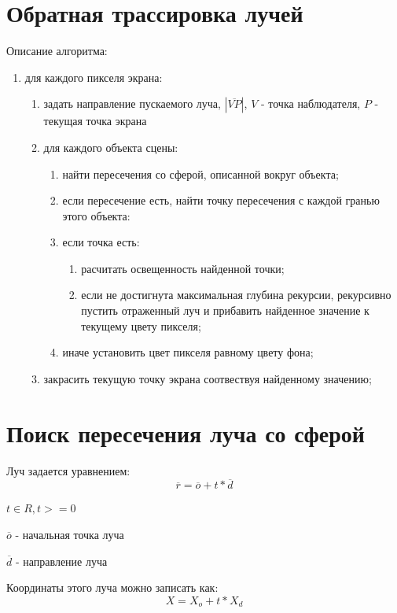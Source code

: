 \documentclass[12pt]{report}
\begin{document}
	\section{Обратная трассировка лучей}

	Описание алгоритма:
	\begin{enumerate}
		\item для каждого пикселя экрана:
		\begin{enumerate}
			\item задать направление пускаемого луча, $|\overline{VP}|$, $V$ - точка наблюдателя, $P$ - текущая точка экрана
			\item для каждого объекта сцены:
			\begin{enumerate}
				\item найти пересечения со сферой, описанной вокруг объекта;
				\item если пересечение есть, найти точку пересечения с каждой гранью этого объекта:
				\item если точка есть:
				\begin{enumerate}
					\item расчитать освещенность найденной точки;
					\item если не достигнута максимальная глубина рекурсии, рекурсивно пустить отраженный луч и прибавить найденное значение к текущему цвету пикселя;
				\end{enumerate}
				\item иначе установить цвет пикселя равному цвету фона;
			\end{enumerate}
			\item закрасить текущую точку экрана соотвествуя найденному значению;
		\end{enumerate}
	\end{enumerate}	

	\section{Поиск пересечения луча со сферой}
	
	Луч задается уравнением:
	\begin{equation}
		\overline{r} = \overline{o} + t*\overline{d}
	\end{equation}
	
	$t \in R, t >= 0$
	
	$\overline{o}$ - начальная точка луча
	
	$\overline{d}$ - направление луча
	
	Координаты этого луча можно записать как:
	\begin{equation}
		X = X_{o} + t*X_{d}
	\end{equation}
	
\end{document}
